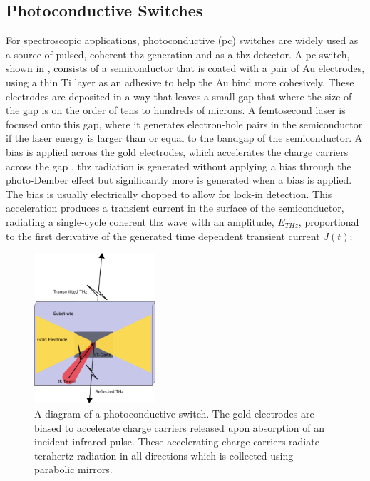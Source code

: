 \subsection{Photoconductive Switches}
\label{subsec:pcswitches}
For spectroscopic applications, photoconductive (\acrshort{pc}) switches \cite{Warren1991} are widely used as a source of pulsed, coherent \acrshort{thz} generation and as a \acrshort{thz} detector. A \acrshort{pc} switch, shown in , consists of a semiconductor that is coated with a pair of Au electrodes, using a thin Ti layer as an adhesive to help the Au bind more cohesively. These electrodes are deposited in a way that leaves a small gap that where the size of the gap is on the order of tens to hundreds of microns. A femtosecond laser is focused onto this gap, where it generates electron\nobreakdash-hole pairs in the semiconductor if the laser energy is larger than or equal to the bandgap of the semiconductor. A bias is applied across the gold electrodes, which accelerates the charge carriers across the gap \cite{Auston1984}. \acrshort{thz} radiation is generated without applying a bias through the photo\nobreakdash-Dember effect \cite{Vaisakh2014} but significantly more is generated when a bias is applied. The bias is usually electrically chopped to allow for lock\nobreakdash-in detection. This acceleration produces a transient current in the surface of the semiconductor, radiating a single\nobreakdash-cycle coherent \acrshort{thz} wave \cite{Burford2017} with an amplitude, \(E_{THz}\), proportional to the first derivative of the generated time dependent transient current \(J(t)\):

\begin{figure}
    \centering
    \includegraphics[width=0.4\textwidth]{Figures/Misc/Theory/PCA.png}
    \captionsetup{font = footnotesize, justification = centering}
    \caption[A Diagram of a Photoconductive Switch]{A diagram of a photoconductive switch. The gold electrodes are biased to accelerate charge carriers released upon absorption of an incident infrared pulse. These accelerating charge carriers radiate terahertz radiation in all directions which is collected using parabolic mirrors.}
    \label{fig:PCA}
\end{figure}

